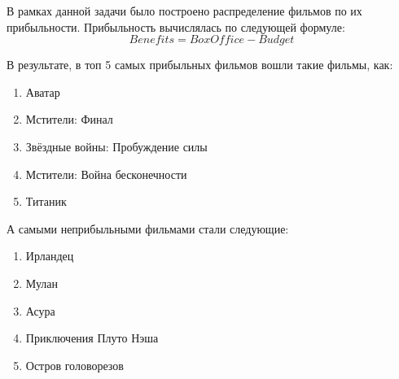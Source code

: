 В рамках данной задачи было построено распределение фильмов по их прибыльности.
Прибыльность вычислялась по следующей формуле:
$$Benefits = BoxOffice - Budget$$ 

В результате, в топ 5 самых прибыльных фильмов вошли такие фильмы, как:
\begin{enumerate}[\IEEEsetlabelwidth{12)}]
	\item Аватар
	\item Мстители: Финал
	\item Звёздные войны: Пробуждение силы
	\item Мстители: Война бесконечности
	\item Титаник
\end{enumerate}

А самыми неприбыльными фильмами стали следующие:
\begin{enumerate}[\IEEEsetlabelwidth{12)}]
	\item Ирландец
	\item Мулан
	\item Асура
	\item Приключения Плуто Нэша
	\item Остров головорезов
\end{enumerate}
